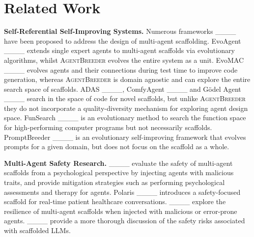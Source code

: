 \section{Related Work}
\label{relatedwork}

\textbf{Self-Referential Self-Improving Systems.} Numerous frameworks ____ have been proposed to address the design of multi-agent scaffolding. EvoAgent ____ extends single expert agents to multi-agent scaffolds via evolutionary algorithms, whilst \textsc{AgentBreeder} evolves the entire system as a unit. EvoMAC ____ evolves agents and their connections during test time to improve code generation, whereas \textsc{AgentBreeder} is domain agnostic and can explore the entire search space of scaffolds. ADAS ____, ComfyAgent ____ and Gödel Agent ____ search in the space of code for novel scaffolds, but unlike \textsc{AgentBreeder} they do not incorporate a quality-diversity mechanism for exploring agent design space. FunSearch ____ is an evolutionary method to search the function space for high-performing computer programs but not necessarily scaffolds. PromptBreeder ____ is an evolutionary self-improving framework that evolves prompts for a given domain, but does not focus on the scaffold as a whole.

\textbf{Multi-Agent Safety Research.} ____ evaluate the safety of multi-agent scaffolds from a psychological perspective by injecting agents with malicious traits, and provide mitigation strategies such as performing psychological assessments and therapy for agents. Polaris ____ introduces a safety-focused scaffold for real-time patient healthcare conversations.
____ explore the resilience of multi-agent scaffolds when injected with malicious or error-prone agents. ____ provide a more thorough discussion of the safety risks associated with scaffolded LLMs.